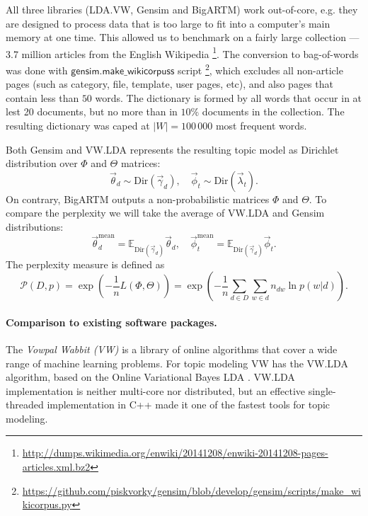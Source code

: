 \documentclass[russian]{llncs}
\newcommand{\kw}[1]{\textsf{#1}}
\begin{document}
All three libraries (LDA.VW, Gensim and BigARTM) work out-of-core,
e.g. they are designed to process data that is too large to fit into a computer's main memory at one time.
This allowed us to benchmark on a fairly large collection --- 3.7 million articles from the English Wikipedia
\footnote{\url{http://dumps.wikimedia.org/enwiki/20141208/enwiki-20141208-pages-articles.xml.bz2}}.
The conversion to bag-of-words was done with $\kw{gensim.make\_wikicorpuss}$ script
\footnote{\url{https://github.com/piskvorky/gensim/blob/develop/gensim/scripts/make_wikicorpus.py}},
which excludes all non-article pages (such as category, file, template, user pages, etc),
and also pages that contain less than $50$ words.
The dictionary is formed by all words that occur in at lest 20 documents,
but no more than in $10\%$ documents in the collection.
The resulting dictionary was caped at $|W| = 100\,000$ most frequent words.

Both Gensim and VW.LDA represents the resulting topic model as Dirichlet distribution over $\Phi$ and $\Theta$ matrices:
\[
	\vec{\theta}_{d} \sim \text{Dir}(\vec{\gamma}_d), \quad \vec{\phi}_{t} \sim \text{Dir}(\vec{\lambda}_t).
\]
On contrary, BigARTM outputs a non-probabilistic matrices $\Phi$ and $\Theta$.
To compare the perplexity we will take the average of VW.LDA and Gensim distributions:
\[
	\vec{\theta}^\text{mean}_d = \mathbb{E}_{\text{Dir}(\vec{\gamma}_d)}\vec{\theta}_d, \quad \vec{\phi}^\text{mean}_t = \mathbb{E}_{\text{Dir}(\vec{\gamma}_d)} \vec{\phi}_t.
\]
The perplexity measure is defined as
\begin{equation}
    \label{eq:perplexity}
    \mathscr{P}(D, p) = \exp\left(- \frac{1}{n} L(\Phi, \Theta) \right) = \exp \left( - \frac{1}{n} \sum_{d \in D} \sum_{w \in d} n_{dw} \ln p(w | d) \right).
\end{equation}

\paragraph{Comparison to existing software packages.}

The \emph{Vowpal Wabbit (VW)} is a library
of online algorithms that cover a wide range of machine learning problems. %
For topic modeling VW has the VW.LDA algorithm, based on the Online Variational Bayes LDA \cite{hoffman10online}.
VW.LDA implementation is neither multi-core nor distributed,
but an effective single-threaded implementation in C++ made it one of the fastest tools for topic modeling.%
\end{document}
